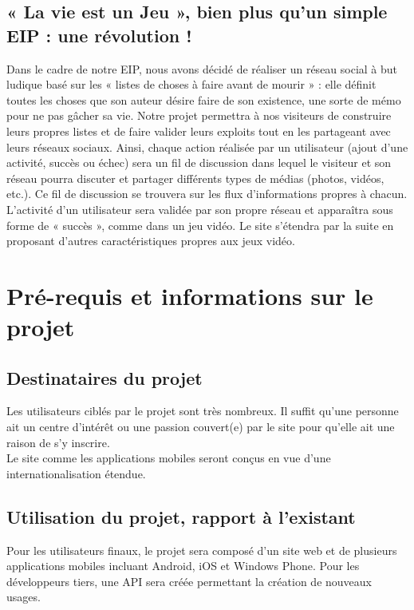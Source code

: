\documentclass{life-fr}
\begin{document}
\section{« La vie est un Jeu », bien plus qu'un simple EIP : une révolution !}

Dans le cadre de notre EIP, nous avons décidé de réaliser un réseau social à but ludique basé sur les « listes de choses à faire avant de mourir » : elle définit toutes les choses que son auteur désire faire de son existence, une sorte de mémo pour ne pas gâcher sa vie. Notre projet permettra à nos visiteurs de construire leurs propres listes et de faire valider leurs exploits tout en les partageant avec leurs réseaux sociaux. Ainsi, chaque action réalisée par un utilisateur (ajout d'une activité, succès ou échec) sera un fil de discussion dans lequel le visiteur et son réseau pourra discuter et partager différents types de médias (photos, vidéos, etc.). Ce fil de discussion se trouvera sur les flux d'informations propres à chacun. L'activité d'un utilisateur sera validée par son propre réseau et apparaîtra sous forme de « succès », comme dans un jeu vidéo. Le site s'étendra par la suite en proposant d'autres caractéristiques propres aux jeux vidéo.


\chapter{Pré-requis et informations sur le projet}

\section{Destinataires du projet}

Les utilisateurs ciblés par le projet sont très nombreux. Il suffit qu'une personne ait un centre d'intérêt ou une passion couvert(e) par le site pour qu'elle ait une raison de s'y inscrire.\\

Le site comme les applications mobiles seront conçus en vue d'une internationalisation étendue.\\

\section{Utilisation du projet, rapport à l'existant}

Pour les utilisateurs finaux, le projet sera composé d'un site web et de plusieurs applications mobiles incluant Android, iOS et Windows Phone. Pour les développeurs tiers, une API sera créée permettant la création de nouveaux usages.\\
\end{document}
